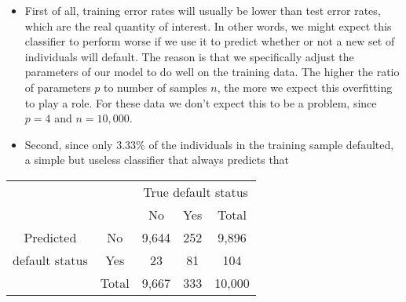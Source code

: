 \documentclass[10pt]{article}
\begin{document}
\begin{itemize}
  \item First of all, training error rates will usually be lower than test error rates, which are the real quantity of interest. In other words, we might expect this classifier to perform worse if we use it to predict whether or not a new set of individuals will default. The reason is that we specifically adjust the parameters of our model to do well on the training data. The higher the ratio of parameters $p$ to number of samples $n$, the more we expect this overfitting to play a role. For these data we don't expect this to be a problem, since $p=4$ and $n=10,000$.
  \item Second, since only $3.33 \%$ of the individuals in the training sample defaulted, a simple but useless classifier that always predicts that

\end{itemize}

\begin{center}
\begin{tabular}{cc|cc|c}
\hline
 &  & \multicolumn{3}{|c}{True default status} \\
 &  & No & Yes & Total \\
\hline
Predicted & No & 9,644 & 252 & 9,896 \\
default status & Yes & 23 & 81 & 104 \\
\cline { 2 - 5 }
 & Total & 9,667 & 333 & 10,000 \\
\hline
\end{tabular}
\end{center}
\end{document}
